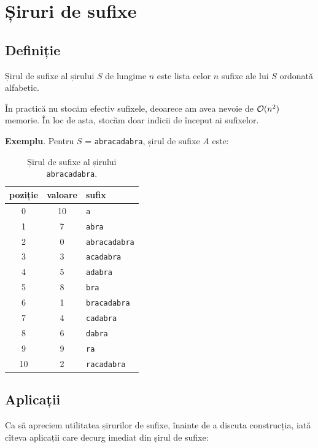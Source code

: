 \documentclass[../main.tex]{subfiles}
\begin{document}
\chapter{Șiruri de sufixe}

\section{Definiție}

\begin{definition}
  Șirul de sufixe al șirului $S$ de lungime $n$ este lista celor $n$ sufixe ale lui $S$ ordonată alfabetic.
\end{definition}

În practică nu stocăm efectiv sufixele, deoarece am avea nevoie de $\mathcal{O}(n^2)$ memorie. În loc de asta, stocăm doar indicii de început ai sufixelor.

\textbf{Exemplu}. Pentru $S$ = \texttt{abracadabra}, șirul de sufixe $A$ este:

\begin{table}[H]
  \centering
  \begin{tabular}{ccl}
    \textbf{poziție} & \textbf{valoare} & \textbf{sufix} \\
    \hline
    0  & 10 & \texttt{a} \\
    1  &  7 & \texttt{abra} \\
    2  &  0 & \texttt{abracadabra} \\
    3  &  3 & \texttt{acadabra} \\
    4  &  5 & \texttt{adabra} \\
    5  &  8 & \texttt{bra} \\
    6  &  1 & \texttt{bracadabra} \\
    7  &  4 & \texttt{cadabra} \\
    8  &  6 & \texttt{dabra} \\
    9  &  9 & \texttt{ra} \\
    10 &  2 & \texttt{racadabra} \\
    \hline
  \end{tabular}
  \caption{Șirul de sufixe al șirului \texttt{abracadabra}.}
\end{table}

\section{Aplicații}

Ca să apreciem utilitatea șirurilor de sufixe, înainte de a discuta construcția, iată cîteva aplicații care decurg imediat din șirul de sufixe:
\end{document}
